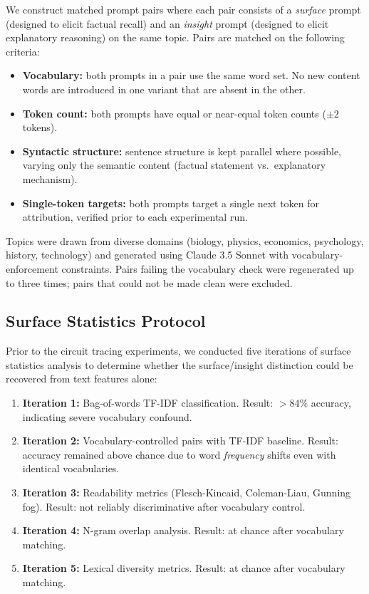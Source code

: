 \documentclass[10pt]{article}
\begin{document}
We construct matched prompt pairs where each pair consists of a \textit{surface} prompt (designed to elicit factual recall) and an \textit{insight} prompt (designed to elicit explanatory reasoning) on the same topic. Pairs are matched on the following criteria:

\begin{itemize}
    \item \textbf{Vocabulary:} both prompts in a pair use the same word set. No new content words are introduced in one variant that are absent in the other.
    \item \textbf{Token count:} both prompts have equal or near-equal token counts ($\pm 2$ tokens).
    \item \textbf{Syntactic structure:} sentence structure is kept parallel where possible, varying only the semantic content (factual statement vs.\ explanatory mechanism).
    \item \textbf{Single-token targets:} both prompts target a single next token for attribution, verified prior to each experimental run.
\end{itemize}

Topics were drawn from diverse domains (biology, physics, economics, psychology, history, technology) and generated using Claude 3.5 Sonnet with vocabulary-enforcement constraints. Pairs failing the vocabulary check were regenerated up to three times; pairs that could not be made clean were excluded.

\subsection{Surface Statistics Protocol}
\label{sec:surface_stats}

Prior to the circuit tracing experiments, we conducted five iterations of surface statistics analysis to determine whether the surface/insight distinction could be recovered from text features alone:

\begin{enumerate}
    \item \textbf{Iteration 1:} Bag-of-words TF-IDF classification. Result: $>$84\% accuracy, indicating severe vocabulary confound.
    \item \textbf{Iteration 2:} Vocabulary-controlled pairs with TF-IDF baseline. Result: accuracy remained above chance due to word \textit{frequency} shifts even with identical vocabularies.
    \item \textbf{Iteration 3:} Readability metrics (Flesch-Kincaid, Coleman-Liau, Gunning fog). Result: not reliably discriminative after vocabulary control.
    \item \textbf{Iteration 4:} N-gram overlap analysis. Result: at chance after vocabulary matching.
    \item \textbf{Iteration 5:} Lexical diversity metrics. Result: at chance after vocabulary matching.
\end{enumerate}
\end{document}

